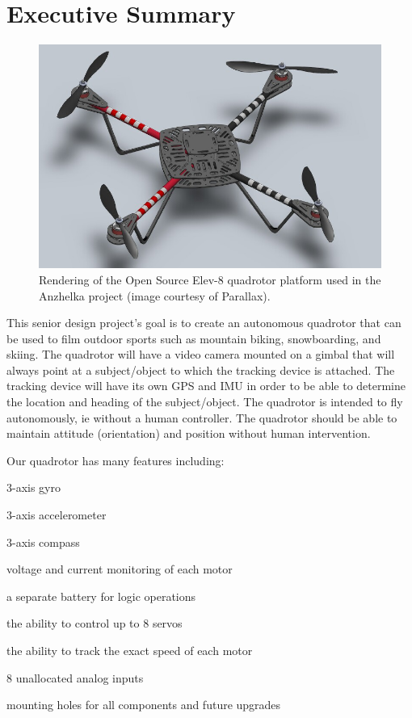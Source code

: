 \documentclass{article}
\numberwithin{equation}{section} %
\begin{document}
\section{Executive Summary}
\begin{figure}[h!]
  \centering
	\includegraphics[scale=.6]{elev_8_rendering.JPG}
  \caption{Rendering of the Open Source Elev-8 quadrotor platform used in the Anzhelka project (image courtesy of Parallax).}
\end{figure}  

This senior design project's goal is to create an autonomous quadrotor that can be used to film outdoor sports such as mountain biking, snowboarding, and skiing. The quadrotor will have a video camera mounted on a gimbal that will always point at a subject/object to which the tracking device is attached. The tracking device will have its own GPS and IMU in order to be able to determine the location and heading of the subject/object. The quadrotor is intended to fly autonomously, ie without a human controller. The quadrotor should be able to maintain attitude (orientation) and position without human intervention.

Our quadrotor has many features including: 
\begin{list}{*}{}
	\item 3-axis gyro
	\item 3-axis accelerometer
	\item 3-axis compass
	\item voltage and current monitoring of each motor
	\item a separate battery for logic operations
	\item the ability to control up to 8 servos
	\item the ability to track the exact speed of each motor
	\item 8 unallocated analog inputs
	\item mounting holes for all components and future upgrades
\end{list}
\end{document}
